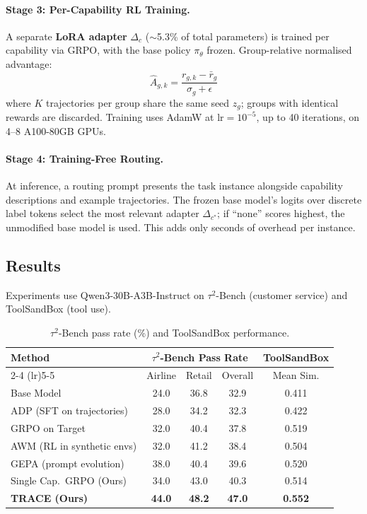 \documentclass[11pt]{article}
\begin{document}
\paragraph{Stage 3: Per-Capability RL Training.}
A separate \textbf{LoRA adapter} $\Delta_c$ ($\sim$5.3\% of total parameters) is trained per capability via GRPO, with the base policy $\pi_\theta$ frozen. Group-relative normalised advantage:
\begin{equation}
    \hat{A}_{g,k} = \frac{r_{g,k} - \bar{r}_g}{\sigma_g + \epsilon}
\end{equation}
where $K$ trajectories per group share the same seed $z_g$; groups with identical rewards are discarded. Training uses AdamW at $\mathrm{lr} = 10^{-5}$, up to 40 iterations, on 4--8 A100-80GB GPUs.

\paragraph{Stage 4: Training-Free Routing.}
At inference, a routing prompt presents the task instance alongside capability descriptions and example trajectories. The frozen base model's logits over discrete label tokens select the most relevant adapter $\Delta_{c^{*}}$; if ``none'' scores highest, the unmodified base model is used. This adds only seconds of overhead per instance.

\subsection{Results}

Experiments use Qwen3-30B-A3B-Instruct on $\tau^{2}$-Bench (customer service) and ToolSandBox (tool use).

\begin{table}[h]
\centering
\caption{$\tau^{2}$-Bench pass rate (\%) and ToolSandBox performance.}
\begin{tabular}{lcccc}
\toprule
\textbf{Method} & \multicolumn{3}{c}{\textbf{$\tau^{2}$-Bench Pass Rate}} & \textbf{ToolSandBox} \\
\cmidrule(lr){2-4} \cmidrule(lr){5-5}
 & Airline & Retail & Overall & Mean Sim. \\
\midrule
Base Model & 24.0 & 36.8 & 32.9 & 0.411 \\
ADP (SFT on trajectories) & 28.0 & 34.2 & 32.3 & 0.422 \\
GRPO on Target & 32.0 & 40.4 & 37.8 & 0.519 \\
AWM (RL in synthetic envs) & 32.0 & 41.2 & 38.4 & 0.504 \\
GEPA (prompt evolution) & 38.0 & 40.4 & 39.6 & 0.520 \\
Single Cap.\ GRPO (Ours) & 34.0 & 43.0 & 40.3 & 0.514 \\
\textbf{TRACE (Ours)} & \textbf{44.0} & \textbf{48.2} & \textbf{47.0} & \textbf{0.552} \\
\bottomrule
\end{tabular}
\end{table}
\end{document}
